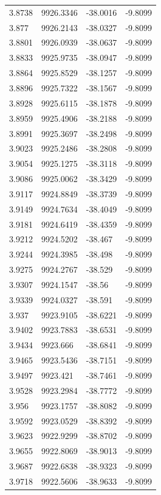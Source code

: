 \begin{table}[H]
\begin{tabular}{llll}
3.8738 & 9926.3346 & -38.0016 & -9.8099 \\
3.877 & 9926.2143 & -38.0327 & -9.8099 \\
3.8801 & 9926.0939 & -38.0637 & -9.8099 \\
3.8833 & 9925.9735 & -38.0947 & -9.8099 \\
3.8864 & 9925.8529 & -38.1257 & -9.8099 \\
3.8896 & 9925.7322 & -38.1567 & -9.8099 \\
3.8928 & 9925.6115 & -38.1878 & -9.8099 \\
3.8959 & 9925.4906 & -38.2188 & -9.8099 \\
3.8991 & 9925.3697 & -38.2498 & -9.8099 \\
3.9023 & 9925.2486 & -38.2808 & -9.8099 \\
3.9054 & 9925.1275 & -38.3118 & -9.8099 \\
3.9086 & 9925.0062 & -38.3429 & -9.8099 \\
3.9117 & 9924.8849 & -38.3739 & -9.8099 \\
3.9149 & 9924.7634 & -38.4049 & -9.8099 \\
3.9181 & 9924.6419 & -38.4359 & -9.8099 \\
3.9212 & 9924.5202 & -38.467 & -9.8099 \\
3.9244 & 9924.3985 & -38.498 & -9.8099 \\
3.9275 & 9924.2767 & -38.529 & -9.8099 \\
3.9307 & 9924.1547 & -38.56 & -9.8099 \\
3.9339 & 9924.0327 & -38.591 & -9.8099 \\
3.937 & 9923.9105 & -38.6221 & -9.8099 \\
3.9402 & 9923.7883 & -38.6531 & -9.8099 \\
3.9434 & 9923.666 & -38.6841 & -9.8099 \\
3.9465 & 9923.5436 & -38.7151 & -9.8099 \\
3.9497 & 9923.421 & -38.7461 & -9.8099 \\
3.9528 & 9923.2984 & -38.7772 & -9.8099 \\
3.956 & 9923.1757 & -38.8082 & -9.8099 \\
3.9592 & 9923.0529 & -38.8392 & -9.8099 \\
3.9623 & 9922.9299 & -38.8702 & -9.8099 \\
3.9655 & 9922.8069 & -38.9013 & -9.8099 \\
3.9687 & 9922.6838 & -38.9323 & -9.8099 \\
3.9718 & 9922.5606 & -38.9633 & -9.8099 \\

\end{tabular}
\end{table}
